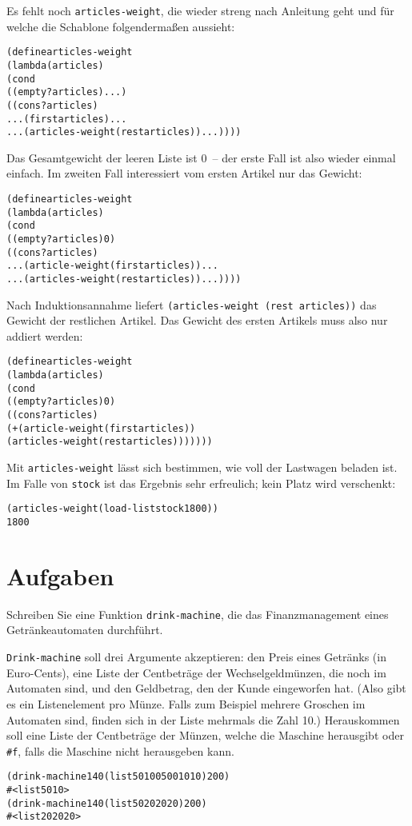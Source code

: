 %
Es fehlt noch \texttt{articles-weight}, die wieder streng nach Anleitung
geht und für welche die Schablone folgendermaßen aussieht:
%
\begin{alltt}
(define articles-weight
  (lambda (articles)
    (cond
     ((empty? articles) ...)
     ((cons? articles)
      ... (first articles) ...
      ... (articles-weight (rest articles)) ...))))
\end{alltt}
%
Das Gesamtgewicht der leeren Liste ist 0~-- der erste Fall ist also
wieder einmal einfach.  Im zweiten Fall interessiert vom ersten
Artikel nur das Gewicht:
%
\begin{alltt}
(define articles-weight
  (lambda (articles)
    (cond
     ((empty? articles) 0)
     ((cons? articles)
      ... (article-weight (first articles)) ...
      ... (articles-weight (rest articles)) ...))))
\end{alltt}
%
Nach Induktionsannahme liefert \texttt{(articles-weight (rest articles))} das
Gewicht der restlichen Artikel.  Das Gewicht des ersten Artikels muss also
nur addiert werden:
%
\begin{alltt}
(define articles-weight
  (lambda (articles)
    (cond
     ((empty? articles) 0)
     ((cons? articles)
      (+ (article-weight (first articles))
         (articles-weight (rest articles)))))))
\end{alltt}
%
Mit \texttt{articles-weight} lässt sich bestimmen, wie voll der
Lastwagen beladen ist.  Im Falle von \texttt{stock} ist das
Ergebnis sehr erfreulich; kein Platz wird verschenkt:
%
\begin{alltt}
(articles-weight (load-list stock 1800))
\evalsto{} 1800
\end{alltt}

\section*{Aufgaben}

\begin{aufgabe}\label{ex:coke-finances}
  Schreiben Sie eine Funktion \texttt{drink-machine}, die das
  Finanzmanagement eines Getränkeautomaten durchführt.
  
  \texttt{Drink-machine} soll drei Argumente akzeptieren: den Preis eines
  Getränks (in Euro-Cents), eine Liste der Centbeträge der
  Wechselgeldmünzen, die noch im Automaten sind, und den Geldbetrag,
  den der Kunde eingeworfen hat.  (Also gibt es ein Listenelement pro
  Münze. Falls zum Beispiel mehrere Groschen im Automaten sind, finden sich
  in der Liste mehrmals die Zahl 10.)  Herauskommen soll eine Liste
  der Centbeträge der Münzen, welche die Maschine herausgibt oder
  \verb|#f|, falls die Maschine nicht herausgeben kann.
\begin{alltt}
(drink-machine 140 (list 50 100 500 10 10) 200)
\evalsto{} #<list 50 10>
(drink-machine 140 (list 50 20 20 20) 200)
\evalsto{} #<list 20 20 20>
\end{alltt}
\end{aufgabe}


